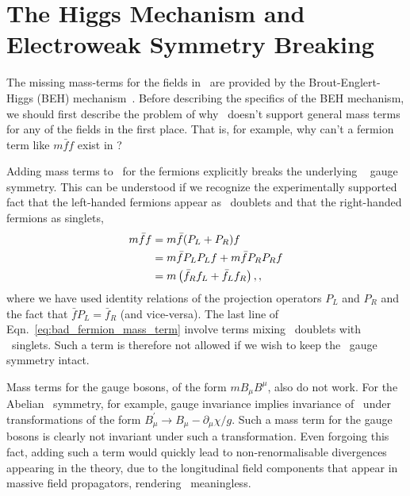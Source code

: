 \section{The Higgs Mechanism and Electroweak Symmetry Breaking}
\label{sec:higgs_description}

The missing mass-terms for the fields in \SML~are provided by the
Brout-Englert-Higgs (BEH) mechanism~\cite{Englert:1964et,Higgs:1964ia,Higgs:1964pj}.
Before describing the specifics of the BEH mechanism, we should first describe the problem
of why \SML~doesn't support general mass terms for any of the fields in the first place.
That is, for example, why can't a fermion term like $m \bar{f} f$ exist in \SML?

Adding mass terms to \SML~for the fermions explicitly breaks the underlying \SUtwo~
gauge symmetry. This can be understood if we recognize the experimentally supported
fact that the left-handed fermions appear as \SUtwo~doublets and that the
right-handed fermions as singlets,
\begin{align}
	m\bar{f}f &= m \bar{f}(P_L + P_R)f \notag \\
				   &= m \bar{f} P_L P_L f + m \bar{f} P_R P_R f  	\label{eq:bad_fermion_mass_term}\\
				   &= m \left( \bar{f}_R f_L + \bar{f}_L f_R \right), \notag
,
\end{align}
where we have used identity relations of the projection operators $P_L$ and $P_R$ and the fact that $\bar{f}P_L = \bar{f}_R$ (and vice-versa). The last line of Eqn.~\ref{eq:bad_fermion_mass_term} involve terms
mixing \SUtwo~doublets with \SUtwo~singlets. Such a term is therefore not allowed if we wish to keep the \SUtwo~gauge symmetry intact.

Mass terms for the gauge bosons, of the form $m B_{\mu} B^{\mu}$, also do not work. For the Abelian \Uone~symmetry, for example, gauge invariance implies invariance of \SML~under transformations
of the form $B_{\mu}^{\prime} \rightarrow B_{\mu} - \partial_{\mu}\chi /g$. Such a mass term for
the gauge bosons is clearly not invariant under such a transformation. Even forgoing this fact,
adding such a term would quickly lead to non-renormalisable divergences appearing in the theory,
due to the longitudinal field components that appear in massive field propagators, rendering \SML~meaningless.

